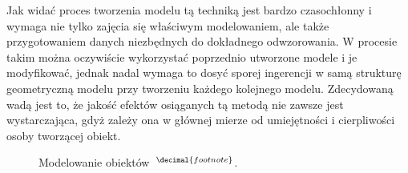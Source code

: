 Jak widać proces tworzenia modelu tą techniką jest bardzo czasochłonny i wymaga
nie tylko zajęcia się właściwym modelowaniem, ale także przygotowaniem danych
niezbędnych do dokładnego odwzorowania. W procesie takim można oczywiście 
wykorzystać poprzednio utworzone modele i je modyfikować, jednak nadal wymaga to
dosyć sporej ingerencji w samą strukturę geometryczną modelu przy tworzeniu
każdego kolejnego modelu.
Zdecydowaną wadą jest to, że jakość efektów osiąganych tą metodą nie zawsze
jest wystarczająca, gdyż zależy ona w głównej mierze od umiejętności i
cierpliwości osoby tworzącej obiekt.

\addtocounter{footnote}{1}
{
\begin{figure}[h]
  \centering
  \quad
  \label{mo_01}
  \caption[Modelowanie obiektów.]{Modelowanie obiektów~$^{\decimal{footnote}}$.}
\end{figure}
\begin{figure}[h]
  \centering

\end{figure}}
